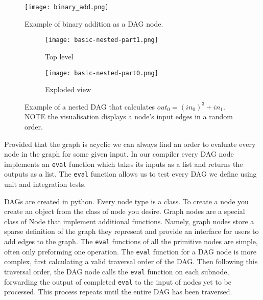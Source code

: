 \begin{figure}[h!]
    \begin{center}
        \texttt{[image: binary\_add.png]}
        \caption{Example of binary addition as a DAG node.}
        \label{fig:bin_add}
    \end{center}
\end{figure}

\begin{figure}[h!]
    \begin{center}
        \begin{subfigure}{.2\textwidth}
            \begin{center}
                \texttt{[image: basic-nested-part1.png]}
                \caption{Top level}
                \label{fig:bn1}
            \end{center}
        \end{subfigure}%
        \begin{subfigure}{.2\textwidth}
            \begin{center}
                \texttt{[image: basic-nested-part0.png]}
                \caption{Exploded view}
                \label{fig:bn0}
            \end{center}
        \end{subfigure}%
        \caption{Example of a nested DAG that calculates $out_0 = (in_0)^3 + in_1$. NOTE the visualisation displays a node's input edges in a random order.}
        \label{fig:bn}
    \end{center}
\end{figure}

Provided that the graph is acyclic we can always find an order to evaluate every node in the graph for some given input.
In our compiler every DAG node implements an \texttt{eval} function which takes its inputs as a list and returns the outputs as a list.
The \texttt{eval} function allows us to test every DAG we define using unit and integration tests.

DAGs are created in python.
Every node type is a class.
To create a node you create an object from the class of node you desire.
Graph nodes are a special class of Node that implement additional functions.
Namely, graph nodes store a sparse definition of the graph they represent and provide an interface for users to add edges to the graph.
The \texttt{eval} functions of all the primitive nodes are simple, often only preforming one operation.
The \texttt{eval} function for a DAG node is more complex, first calculating a valid traversal order of the DAG.
Then following this traversal order, the DAG node calls the \texttt{eval} function on each subnode, forwarding the output of completed \texttt{eval} to the input of nodes yet to be processed.
This process repeats until the entire DAG has been traversed.

